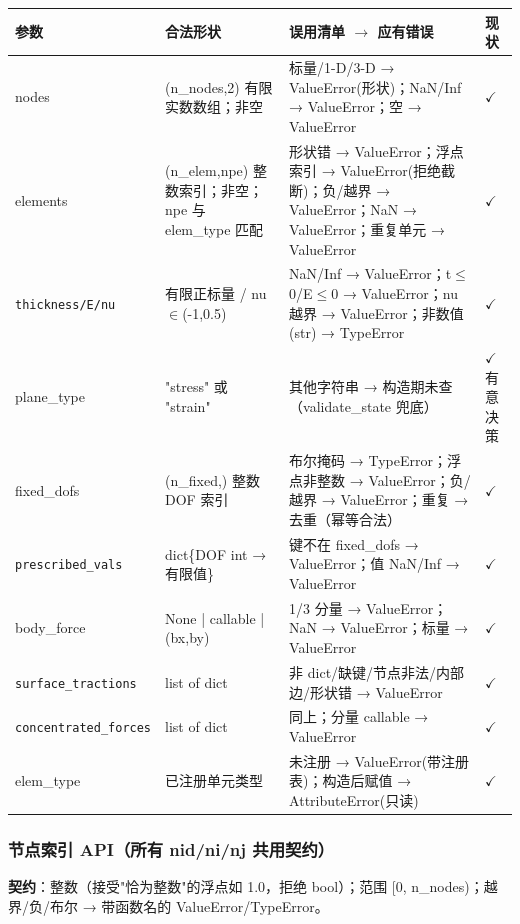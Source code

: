 \documentclass[12pt,a4paper]{ctexart}
\begin{document}
\begin{longtable}{p{3.8cm}p{3.4cm}p{5.2cm}p{1.2cm}}
\toprule
\textbf{参数} & \textbf{合法形状} & \textbf{误用清单 $\to$ 应有错误} & \textbf{现状} \\
\midrule
nodes & (n\_nodes,2) 有限实数数组；非空 & 标量/1-D/3-D → ValueError(形状)；NaN/Inf → ValueError；空 → ValueError & $\checkmark$ \\
elements & (n\_elem,npe) 整数索引；非空；npe 与 elem\_type 匹配 & 形状错 → ValueError；浮点索引 → ValueError(拒绝截断)；负/越界 → ValueError；NaN → ValueError；重复单元 → ValueError & $\checkmark$ \\
\texttt{thickness/\newline E/nu} & 有限正标量 / nu$\in$(-1,0.5) & NaN/Inf → ValueError；t$\leq$0/E$\leq$0 → ValueError；nu 越界 → ValueError；非数值(str) → TypeError & $\checkmark$ \\
plane\_type & "stress" 或 "strain" & 其他字符串 → 构造期未查（validate\_state 兜底） & $\checkmark$ 有意决策 \\
fixed\_dofs & (n\_fixed,) 整数 DOF 索引 & 布尔掩码 → TypeError；浮点非整数 → ValueError；负/越界 → ValueError；重复 → 去重（幂等合法） & $\checkmark$ \\
\texttt{prescribed\_\newline vals} & dict\{DOF int → 有限值\} & 键不在 fixed\_dofs → ValueError；值 NaN/Inf → ValueError & $\checkmark$ \\
body\_force & None | callable | (bx,by) & 1/3 分量 → ValueError；NaN → ValueError；标量 → ValueError & $\checkmark$ \\
\texttt{surface\_\newline tractions} & list of dict & 非 dict/缺键/节点非法/内部边/形状错 → ValueError & $\checkmark$ \\
\texttt{concentrated\_\newline forces} & list of dict & 同上；分量 callable → ValueError & $\checkmark$ \\
elem\_type & 已注册单元类型 & 未注册 → ValueError(带注册表)；构造后赋值 → AttributeError(只读) & $\checkmark$ \\
\bottomrule
\end{longtable}

\subsubsection{节点索引 API（所有 nid/ni/nj 共用契约）}

\textbf{契约}：整数（接受"恰为整数"的浮点如 1.0，拒绝 bool）；范围
[0, n\_nodes)；越界/负/布尔 → 带函数名的 ValueError/TypeError。
\end{document}
